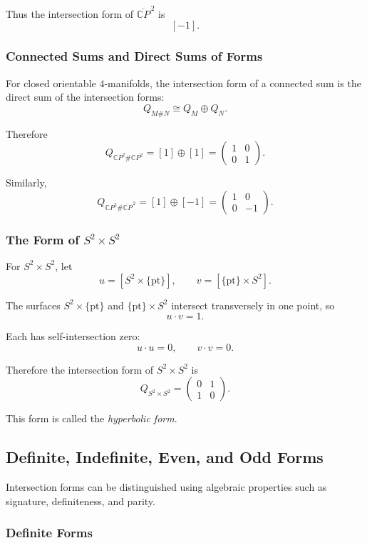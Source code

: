 \documentclass[12pt,a4paper]{article}
\theoremstyle{notespace}
\begin{document}
Thus the intersection form of \(\overline{\mathbb CP}^{\,2}\) is
\[
[-1].
\]

\subsubsection{Connected Sums and Direct Sums of Forms}

For closed orientable \(4\)-manifolds, the intersection form of a connected sum
is the direct sum of the intersection forms:
\[
Q_{M\# N}\cong Q_M\oplus Q_N.
\]

Therefore
\[
Q_{\mathbb CP^2\#\mathbb CP^2}
=
[1]\oplus [1]
=
\begin{pmatrix}
	1&0\\
	0&1
\end{pmatrix}.
\]

Similarly,
\[
Q_{\mathbb CP^2\#\overline{\mathbb CP}^{\,2}}
=
[1]\oplus [-1]
=
\begin{pmatrix}
	1&0\\
	0&-1
\end{pmatrix}.
\]

\subsubsection{The Form of \(S^2\times S^2\)}

For \(S^2\times S^2\), let
\[
u=[S^2\times\{\mathrm{pt}\}],
\qquad
v=[\{\mathrm{pt}\}\times S^2].
\]

The surfaces \(S^2\times\{\mathrm{pt}\}\) and \(\{\mathrm{pt}\}\times S^2\)
intersect transversely in one point, so
\[
u\cdot v=1.
\]

Each has self-intersection zero:
\[
u\cdot u=0,
\qquad
v\cdot v=0.
\]

Therefore the intersection form of \(S^2\times S^2\) is
\[
Q_{S^2\times S^2}
=
\begin{pmatrix}
	0&1\\
	1&0
\end{pmatrix}.
\]

This form is called the \emph{hyperbolic form}.

\subsection{Definite, Indefinite, Even, and Odd Forms}

Intersection forms can be distinguished using algebraic properties such as
signature, definiteness, and parity.

\subsubsection{Definite Forms}
\end{document}
